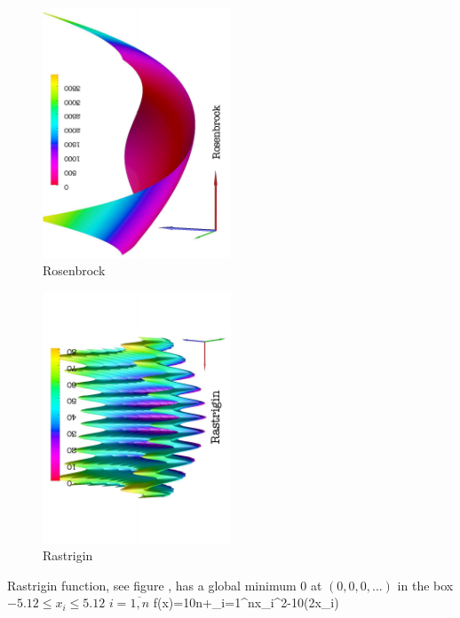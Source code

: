 \begin{figure}[!htb]
\begin{center}
\includegraphics[width=0.5\textwidth,angle=-90]{figures/rosenbrock}
\end{center}
\caption{Rosenbrock  }
\label{rosenbrock}
\end{figure}
\begin{figure}[tb]
\begin{center}
\includegraphics[width=0.5\textwidth,angle=-90]{figures/rastrigin}
\end{center}
\caption{Rastrigin   }
\label{rastrigin}
\end{figure}
\par{Rastrigin function, see figure ,  has a global minimum 0 at $(0,0,0,...)$ in the box
$-5.12\leq x_i \leq 5.12$ $i=\overline{1,n}$}
\be
\label{rastriginf}
f(x)=10n+\sum_{i=1}^{n}x_i^2-10\cos(2\pi x_i)
